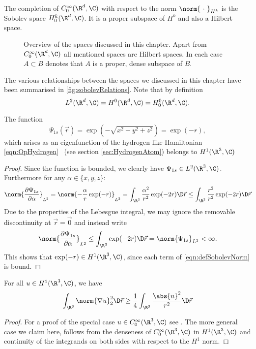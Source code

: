 \begin{defn}
	The completion of $C^\infty_0(\R^d, \C)$
	with respect to the norm $\norm{~\cdot~}_{H^k}$
	is the Sobolev space $H^k_0(\R^d, \C)$.
	It is a proper subspace of $H^k$ and also a Hilbert space.
\end{defn}

\begin{figure}
	\centering
	\caption{Overview of the spaces discussed in this chapter.
		Apart from $C^\infty_0(\R^d, \C)$ all mentioned spaces are Hilbert spaces.
		In each case $A \subset B$ denotes that $A$ is a proper, dense
		subspace of $B$.}
	\label{fig:sobolevRelations}
\end{figure}
The various relationships between the spaces we discussed
in this chapter have been summarised in \fig \vref{fig:sobolevRelations}.
Note that by definition
\[ L^2(\R^d, \C) = H^0(\R^d, \C) = H^0_0(\R^d, \C). \]

\begin{exmp}
	\label{exmp:H1sH1}
	The function
	\[ \Psi_{1s}(\vec{r}) = \exp\left(- \sqrt{x^2 + y^2 + z^2} \right) = \exp(-r), \]
	which arises as an eigenfunction
	of the hydrogen-like Hamiltonian \eqref{eqn:OpHydrogen}%
	~(see section \vref{sec:HydrogenAtom})
	belongs to $H^1(\R^3, \C)$
	\begin{proof}
	Since the function is bounded, we clearly have $\Psi_{1s} \in L^2(\R^3, \C)$.
	Furthermore for any $\alpha \in \{x, y, z\}$:
	\begin{equation}
		\norm{ \frac{\partial \Psi_{1s}}{\partial \alpha} }_{L^2}
		= \norm{ - \frac{\alpha}{r} \exp(-r) }_{L^2}
		= \int_{\R^3} \frac{\alpha^2}{r^2} \exp(-2r) \D\vec{r}
		\leq \int_{\R^3} \frac{r^2}{r^2} \exp(-2r) \D\vec{r}
		\label{eqn:ProofH1sH1}
	\end{equation}
	Due to the properties of the Lebesgue integral,
	we may ignore the removable discontinuity at $\vec{r} = \vec{0}$
	and instead write
	\[ \norm{ \frac{\partial \Psi_{1s}}{\partial \alpha} }_{L^2}
		\leq \int_{\R^3} \exp(-2r) \D\vec{r} = \norm{\Psi_{1s}}_{L^2} < \infty. \]
	This shows that $\exp(-r) \in H^1(\R^3, \C)$,
	since each term of \eqref{eqn:defSobolevNorm} is bound.
	\end{proof}
\end{exmp}

\begin{prop}
	\label{prop:Hardy}
	For all $u \in H^1(\R^3, \C)$, we have
	\[ \int_{\R^3} \norm{\nabla u}_2^2 \D\vec{r}
		\geq \frac{1}{4} \int_{\R^3} \frac{\abs{u}^2}{r^2} \D\vec{r} \]
	\begin{proof}
		For a proof of the special case $u \in C_0^\infty(\R^3, \C)$
		see \cite[p. 30]{Helffer2013}.
		The more general case we claim here,
		follows from the denseness of $C_0^\infty(\R^3, \C)$ in $H^1(\R^3, \C)$
		and continuity of the integrands on both sides
		with respect to the $H^1$ norm.
	\end{proof}
\end{prop}

